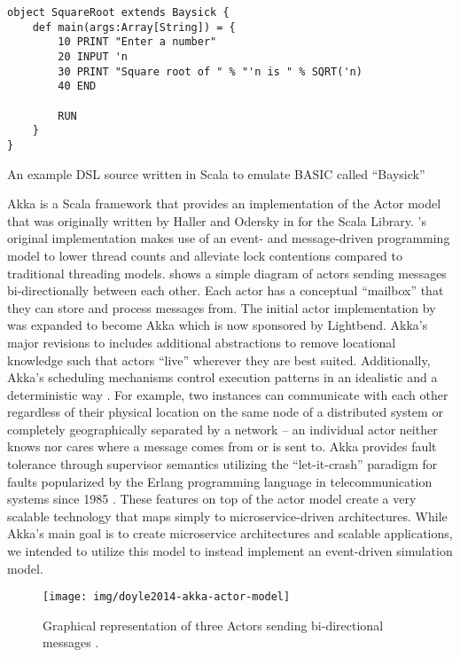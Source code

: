\begin{listing}[b!]
\begin{verbatim}
object SquareRoot extends Baysick {
    def main(args:Array[String]) = {
        10 PRINT "Enter a number"
        20 INPUT 'n
        30 PRINT "Square root of " % "'n is " % SQRT('n)
        40 END
        
        RUN
    }
}
\end{verbatim}
\caption{An example DSL source written in Scala to emulate BASIC called ``Baysick'' \cite{FogusBaysick}}
\label{lst:scala-dsl-basic}
\end{listing}

Akka is a Scala framework that provides an implementation of the Actor model \cite{Agha1985} that was originally written by Haller and Odersky in \cite{Haller2009} for the Scala Library. \cite{Haller2009}'s original implementation makes use of an event- and message-driven programming model to lower thread counts and alleviate lock contentions compared to traditional threading models.  shows a simple diagram of actors sending messages bi-directionally between each other. Each actor has a conceptual ``mailbox'' that they can store and process messages from. The initial actor implementation by \cite{Haller2009} was expanded to become Akka which is now sponsored by Lightbend. Akka's major revisions to \cite{Haller2009} includes additional abstractions to remove locational knowledge such that actors ``live'' wherever they are best suited. Additionally, Akka's scheduling mechanisms control \akkaActor{} execution patterns in an idealistic and a deterministic way \cite{TypesafeAkka2015}. For example, two \akkaActor{} instances can communicate with each other regardless of their physical location on the same node of a distributed system or completely geographically separated by a network -- an individual actor neither knows nor cares where a message comes from or is sent to. Akka provides fault tolerance through supervisor semantics utilizing the ``let-it-crash'' paradigm for faults popularized by the Erlang programming language in telecommunication systems since 1985 \cite{Armstrong2010}. These features on top of the actor model create a very scalable technology that maps simply to microservice-driven architectures. While Akka's main goal is to create microservice architectures and scalable applications, we intended to utilize this model to instead implement an event-driven simulation model.

\begin{figure}[th!]
    \centering
    \texttt{[image: img/doyle2014-akka-actor-model]}
    \caption{Graphical representation of three Actors sending bi-directional messages \cite{DoyleAkka2014}.}
    \label{fig:doyle2014-akka-actor-model}
\end{figure} 

